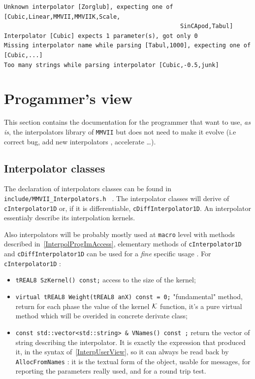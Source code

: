 \begin{verbatim}
Unknown interpolator [Zorglub], expecting one of [Cubic,Linear,MMVII,MMVIIK,Scale,
                                                  SinCApod,Tabul]
Interpolator [Cubic] expects 1 parameter(s), got only 0
Missing interpolator name while parsing [Tabul,1000], expecting one of [Cubic,...]
Too many strings while parsing interpolator [Cubic,-0.5,junk]
\end{verbatim}


\section{Progammer's view}

This section contains the documentation for the programmer that want to use, \emph{as is}, the
interpolators library of {\tt MMVII} but does not need to make it evolve (i.e correct bug, add new interpolators ,
accelerate \dots).



\subsection{Interpolator classes}

The declaration of interpolators classes can be found in {\tt include/MMVII\_Interpolators.h } .
The interpolator classes will derive of {\tt cInterpolator1D}  or, if it is differentiable,
{\tt cDiffInterpolator1D}.   An interpolator essentialy describe its interpolation kernels.

Also interpolators will be probably mostly used at {\tt macro}
level with  methods described in~\ref{InterpolProgImAccess}, elementary methods
of {\tt cInterpolator1D}  and {\tt cDiffInterpolator1D}
can be used for a \emph{fine} specific usage . For {\tt cInterpolator1D} :

\begin{itemize}
   \item  {\tt tREAL8 SzKernel() const;}  access to the size of the kernel;

   \item  {\tt virtual tREAL8  Weight(tREAL8  anX) const = 0;} "fundamental" method, return
          for each phase the value of the kernel $\mathcal K$  function, it's a pure virtual method
          which will be overided in concrete derivate class;

    \item {\tt const std::vector<std::string> \& VNames() const ;} return the vector of string
          describing the interpolator.  It is exactly the expression that produced it, in the syntax
          of~\ref{InterpUserView}, so it can always be read back by {\tt AllocFromNames} : it is the
          textual form of the object, usable for messages, for reporting the parameters really used,
          and for a round trip test.
\end{itemize}

